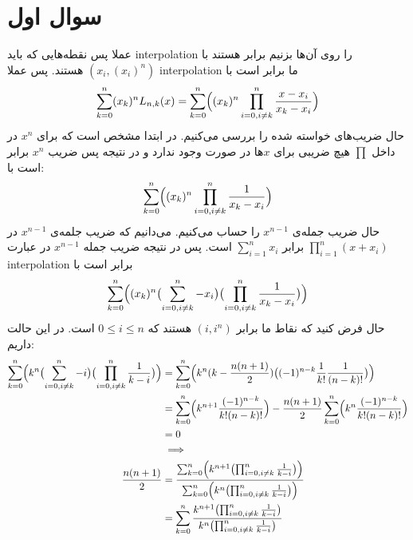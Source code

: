 \documentclass[]{article}
\begin{document}
\printheader

\section*{سوال اول}
عملا پس نقطه‌هایی که باید
interpolation
را روی آن‌ها بزنیم برابر هستند با
$\left(x_i, \left(x_i\right)^n\right)$
هستند. پس عملا
interpolation
ما برابر است با
\begin{gather*}
    \sum_{k=0}^{n} (x_k)^n L_{n, k} (x) = \sum_{k=0}^{n} \Bigl((x_k)^n \prod_{i=0, i \neq k}^{n} \frac{x - x_i}{x_k - x_i}\Bigr)
\end{gather*}
حال ضریب‌های خواسته شده را بررسی می‌کنیم. در ابتدا مشخص است که برای
$x^n$
در داخل
$\prod$
هیچ ضریبی برای
$x$ها
در صورت وجود ندارد و در نتیجه پس ضریب
$x^n$
برابر است با:
\begin{gather*}
    \sum_{k=0}^{n} \Bigl( (x_k)^n \prod_{i=0, i \neq k}^{n} \frac{1}{x_k - x_i} \Bigr)
\end{gather*}
حال ضریب جمله‌ی
$x^{n-1}$
را حساب می‌کنیم. می‌دانیم که ضریب جلمه‌ی
$x^{n-1}$
در
$\prod_{i=1}^n (x + x_i)$
برابر
$\sum_{i=1}^n x_i$
است. پس در نتیجه ضریب جمله
$x^{n-1}$
در عبارت
interpolation
برابر است با
\begin{gather*}
    \sum_{k=0}^{n} \Bigl((x_k)^n \bigl( \sum_{i=0, i \neq k}^{n} -x_i  \bigr) \bigl( \prod_{i=0, i \neq k}^{n} \frac{1}{x_k - x_i} \bigr) \Bigr)
\end{gather*}
حال فرض کنید که نقاط ما برابر
$(i, i^n)$
هستند که
$0 \le i \le n$
است. در این حالت داریم:
\begin{align*}
    \sum_{k=0}^{n} \Bigl(k^n \bigl( \sum_{i=0, i \neq k}^{n} -i  \bigr) \bigl(\prod_{i=0, i \neq k}^{n} \frac{1}{k - i} \bigr) \Bigr)
    &= \sum_{k=0}^{n} \Bigl(k^n (k - \frac{n(n+1)}{2}) \bigl((-1)^{n-k} \frac{1}{k!} \frac{1}{(n - k)!} \bigr) \Bigr)\\
    &= \sum_{k=0}^{n} \Bigl(k^{n+1} \frac{(-1)^{n-k}}{k!(n - k)!} \Bigr) - \frac{n(n+1)}{2} \sum_{k=0}^{n} \Bigl(k^n \frac{(-1)^{n-k}}{k!(n - k)!}\Bigr)\\
    &=0\\
    &\implies\\
    \frac{n(n+1)}{2}
    &=\frac{\sum_{k=0}^{n} \Bigl(k^{n+1} \bigl( \prod_{i=0, i \neq k}^{n} \frac{1}{k - i} \bigr) \Bigr)}{\sum_{k=0}^{n} \Bigl(k^n \bigl( \prod_{i=0, i \neq k}^{n} \frac{1}{k - i} \bigr) \Bigr)}\\
    &=\sum_{k=0}^{n} \frac{k^{n+1} \bigl( \prod_{i=0, i \neq k}^{n} \frac{1}{k - i} \bigr)}{k^n \bigl( \prod_{i=0, i \neq k}^{n} \frac{1}{k - i} \bigr)}
\end{align*}
\end{document}
